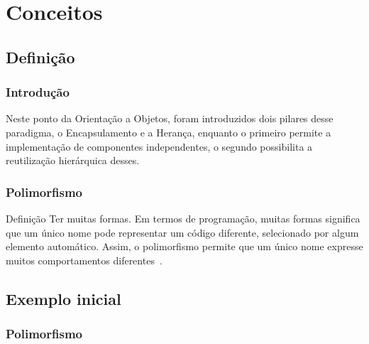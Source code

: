 \section{Conceitos}

\subsection{Definição}

\begin{frame}
\frametitle{Introdução}
\justifying
\quad Neste ponto da Orientação a Objetos, foram introduzidos dois pilares desse paradigma, o Encapsulamento e a Herança, enquanto o primeiro permite a implementação de componentes independentes, o segundo possibilita a reutilização hierárquica desses.
\end{frame}

\begin{frame}
\frametitle{Polimorfismo}
\begin{block}{Definição}
\qquad Ter muitas formas. Em termos de programação, muitas formas significa que um único nome pode representar um código diferente, selecionado por algum elemento automático. Assim, o polimorfismo permite que um único nome expresse muitos comportamentos diferentes~\cite{sintes2002aprenda}.
\end{block}
\end{frame}

\subsection{Exemplo inicial}

\begin{frame}
\frametitle{Polimorfismo}



\end{frame}